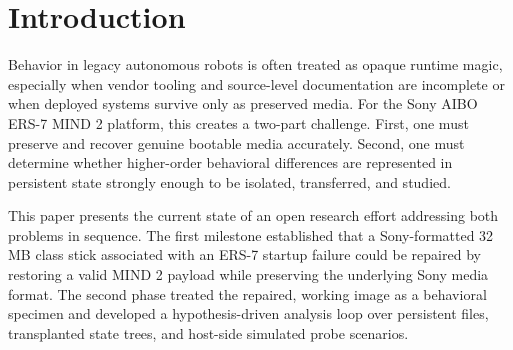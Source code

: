 \maketitle

\begin{abstract}
This paper reports a practical research program for studying higher-order
behavior in Sony AIBO ERS-7 MIND 2 systems from preserved Memory Stick state.
The work begins with forensic recovery of a non-booting Sony-formatted stick,
establishes a reproducible restoration and preservation workflow, and then
pivots into behavior forensics over persistent application state. We describe a
host-side MIND 2 behavior simulator used as a hypothesis engine, identify
candidate persistent-state levers including \texttt{STTLOG} row \texttt{0400},
\texttt{STTLOG} row \texttt{1200}, and specimen-side \texttt{IEG.CFG}, and
show that these levers support distinct behavioral interpretations under a
growing family of probe scenarios. The current evidence suggests that
\texttt{0400} acts as a shutdown-side pivot, \texttt{1200} expresses
socially-cued persistence, and specimen-side \texttt{IEG.CFG} expresses a more
routine-preserving and multi-cycle persistence family. The contribution is not
a claim of decoded Sony internal logic, but a reproducible methodology that
links filesystem forensics, preserved media, host-side simulation, and live
hardware testing.
\end{abstract}

\section{Introduction}
Behavior in legacy autonomous robots is often treated as opaque runtime magic,
especially when vendor tooling and source-level documentation are incomplete or
when deployed systems survive only as preserved media. For the Sony AIBO ERS-7
MIND 2 platform, this creates a two-part challenge. First, one must preserve
and recover genuine bootable media accurately. Second, one must determine
whether higher-order behavioral differences are represented in persistent state
strongly enough to be isolated, transferred, and studied.

This paper presents the current state of an open research effort addressing
both problems in sequence. The first milestone established that a Sony-formatted
32 MB class stick associated with an ERS-7 startup failure could be repaired by
restoring a valid MIND 2 payload while preserving the underlying Sony media
format. The second phase treated the repaired, working image as a behavioral
specimen and developed a hypothesis-driven analysis loop over persistent files,
transplanted state trees, and host-side simulated probe scenarios.

